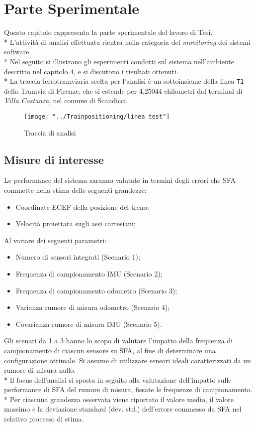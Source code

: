 \chapter{Parte Sperimentale}
Questo capitolo rappresenta la parte sperimentale del lavoro di Tesi.\\*
L'attivit\`a di analisi effettuata rientra nella categoria del \emph{monitoring} dei sistemi software.\\*
Nel seguito si illustrano gli esperimenti condotti sul sistema nell'ambiente descritto nel capitolo 4, e si discutono i risultati ottenuti.\\*
La traccia ferrotramviaria scelta per l'analisi \`e un sottoinsieme della linea \texttt{T1} della Tramvia di Firenze, che si estende per $4.25044$ chilometri dal terminal di \emph{Villa Costanza}, nel comune di Scandicci. 
\begin{figure}[h]
	\centering
	\texttt{[image: "../Trainpositioning/linea test"]}
	\caption{Traccia di analisi}
	\label{fig:linea-test}
\end{figure}
\section{Misure di interesse}
Le performance del sistema saranno valutate in termini degli errori che SFA commette nella stima delle seguenti grandezze:
\begin{itemize}
	\item Coordinate ECEF della posizione del treno;
	\item Velocit\`a proiettata sugli assi cartesiani;
\end{itemize}
Al variare dei seguenti parametri:
\begin{itemize}
	\item Numero di sensori integrati (Scenario 1);
	\item Frequenza di campionamento IMU (Scenario 2);
	\item Frequenza di campionamento odometro (Scenario 3);
	\item Varianza rumore di misura odometro (Scenario 4);
	\item Covarianza rumore di misura IMU (Scenario 5).
\end{itemize}
Gli scenari da 1 a 3 hanno lo scopo di valutare l'impatto della frequenza di campionamento di ciascun sensore su SFA, al fine di determinare una configurazione ottimale. Si assume di utilizzare sensori ideali caratterizzati da un rumore di misura nullo.\\*
Il focus dell'analisi si sposta in seguito alla valutazione dell'impatto sulle performance di SFA del rumore di misura, fissate le frequenze di campionamento.\\*
Per ciascuna grandezza osservata viene riportato il valore medio, il valore
massimo e la deviazione standard (dev. std.) dell'errore commesso da SFA nel relativo processo di stima.
